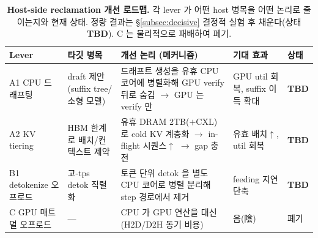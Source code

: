 
\begin{table}[t]
\centering
\caption{\textbf{Host-side reclamation 개선 로드맵.}
  각 lever 가 어떤 host 병목을 어떤 논리로 줄이는지와 현재 상태.
  정량 결과는 \S\ref{subsec:decisive} 결정적 실험 후 채운다(상태 \textbf{TBD}).
  C 는 물리적으로 패배하여 폐기.}
\label{tbl:roadmap}
\footnotesize
\setlength{\tabcolsep}{4pt}
\begin{tabular}{@{}
  >{\raggedright\arraybackslash}p{}
  >{\raggedright\arraybackslash}p{}
  >{\raggedright\arraybackslash}p{}
  >{\raggedright\arraybackslash}p{}
  >{\raggedright\arraybackslash}p{}@{}}
\toprule
\textbf{Lever} & \textbf{타깃 병목} & \textbf{개선 논리 (메커니즘)} & \textbf{기대 효과} & \textbf{상태} \\
\midrule
A1 CPU 드래프팅 & draft 제안 (suffix tree/소형 모델) & 드래프트 생성을 유휴 CPU 코어에 병렬화해 GPU verify 뒤로 숨김 $\to$ GPU 는 verify 만 & GPU util 회복, suffix 이득 확대 & \textbf{TBD} \\
A2 KV tiering & HBM 한계로 배치/컨텍스트 제약 & 유휴 DRAM 2TB($+$CXL)로 cold KV 계층화 $\to$ in-flight 시퀀스$\uparrow$ $\to$ gap 충전 & 유효 배치$\uparrow$, util 회복 & \textbf{TBD} \\
B1 detokenize 오프로드 & 고-tps detok 직렬화 & 토큰 단위 detok 을 별도 CPU 코어로 병렬 분리해 step 경로에서 제거 & feeding 지연 단축 & \textbf{TBD} \\
\midrule
C GPU 매트멀 오프로드 & --- & CPU 가 GPU 연산을 대신 (H2D/D2H 동기 비용) & 음(陰) & 폐기 \\
\bottomrule
\end{tabular}
\end{table}

